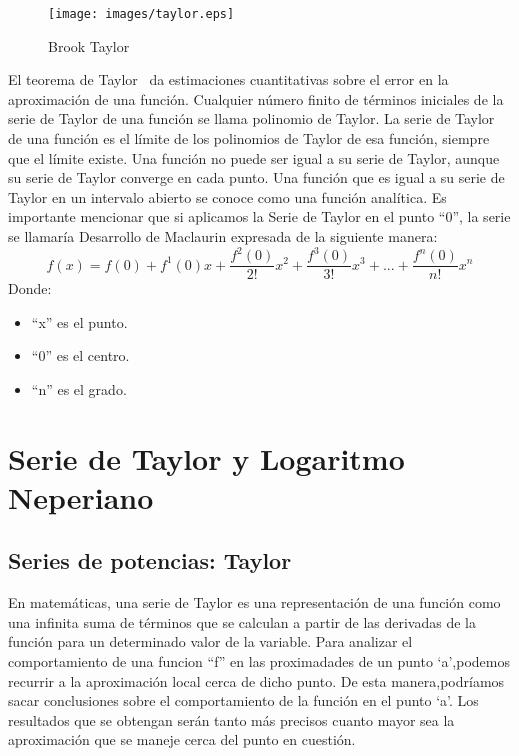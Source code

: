 \documentclass[spanish,a4paper,11pt,twoside]{report}
\begin{document}
\begin{figure}[!th]
\begin{center}
\texttt{[image: images/taylor.eps]}
\caption{Brook Taylor}
\label{fig:1}
\end{center}
\end{figure}
 
El teorema de Taylor~\cite{Burgos:2004} da estimaciones cuantitativas sobre el error en la aproximación de una función. Cualquier número finito de términos iniciales de la serie de Taylor de una función se llama
polinomio de Taylor. La serie de Taylor de una función es el límite de los polinomios de Taylor de esa función, siempre que el límite existe. Una función no puede ser igual a su serie 
de Taylor, aunque su serie de Taylor converge en cada punto. Una función que es igual a su serie de Taylor en un intervalo abierto se conoce como una función analítica.
Es importante mencionar que si aplicamos la Serie de Taylor en el punto ``0'', la serie se llamaría Desarrollo de Maclaurin expresada de la siguiente manera:
 \[f(x)=f(0)+f^1(0)x+\frac{f^2(0)}{2!}x^2+\frac{f^3(0)}{3!}x^3+...+\frac{f^n(0)}{n!}x^n\]
Donde:
\begin{center}
\begin{itemize}
\item ``x'' es el punto.
\item ``0'' es el centro.
\item ``n'' es el grado.
\end{itemize}
\end{center}
 

\cleardoublepage


\chapter{Serie de Taylor y Logaritmo Neperiano}
\section{Series de potencias: Taylor}%
En matemáticas, una serie de Taylor es una representación de una función como una infinita suma de términos que se calculan a partir de las derivadas de la función para un determinado valor de la variable.
Para analizar el comportamiento de una funcion ``f'' en las proximadades de un punto `a',podemos recurrir a la aproximación local cerca de dicho punto. De esta manera,podríamos sacar conclusiones sobre el
comportamiento de la función en el punto `a'.
Los resultados que se obtengan serán tanto más precisos cuanto mayor sea la aproximación que se maneje cerca del punto en cuestión.
\end{document}
